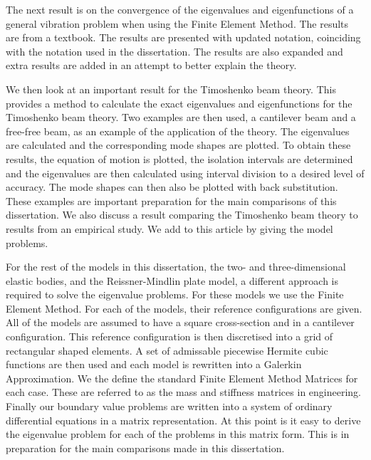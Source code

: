 \documentclass[../main.tex]{subfiles}
\begin{document}
The next result is on the convergence of the eigenvalues and eigenfunctions of a general vibration problem when using the Finite Element Method. The results are from a textbook. The results are presented with updated notation, coinciding with the notation used in the dissertation. The results are also expanded and extra results are added in an attempt to better explain the theory.

We then look at an important result for the Timoshenko beam theory. This provides a method to calculate the exact eigenvalues and eigenfunctions for the Timoshenko beam theory. Two examples are then used, a cantilever beam and a free-free beam, as an example of the application of the theory. The eigenvalues are calculated and the corresponding mode shapes are plotted. To obtain these results, the equation of motion is plotted, the isolation intervals are determined and the eigenvalues are then calculated using interval division to a desired level of accuracy. The mode shapes can then also be plotted with back substitution. These examples are important preparation for the main comparisons of this dissertation. We also discuss a result comparing the Timoshenko beam theory to results from an empirical study. We add to this article by giving the model problems.

For the rest of the models in this dissertation, the two- and three-dimensional elastic bodies, and the Reissner-Mindlin plate model, a different approach is required to solve the eigenvalue problems. For these models we use the Finite Element Method. For each of the models, their reference configurations are given. All of the models are assumed to have a square cross-section and in a cantilever configuration. This reference configuration is then discretised into a grid of rectangular shaped elements. A set of admissable piecewise Hermite cubic functions are then used and each model is rewritten into a Galerkin Approximation. We the define the standard Finite Element Method Matrices for each case. These are referred to as the mass and stiffness matrices in engineering. Finally our boundary value problems are written into a system of ordinary differential equations in a matrix representation. At this point is it easy to derive the eigenvalue problem for each of the problems in this matrix form. This is in preparation for the main comparisons made in this dissertation. 
\end{document}

